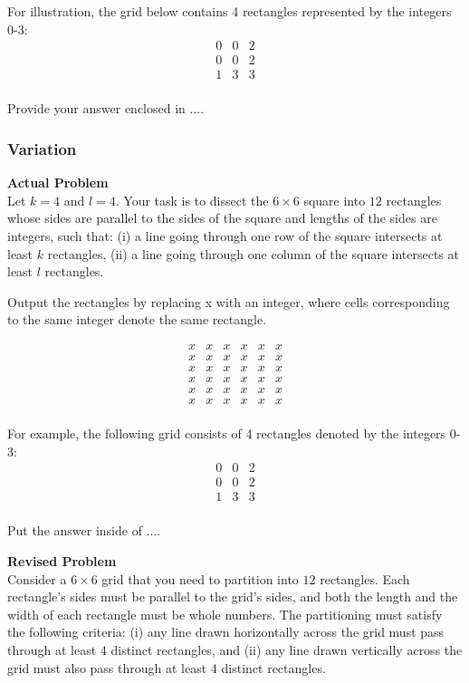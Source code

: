 For illustration, the grid below contains 4 rectangles represented by the integers 0-3:
$$
\begin{array}{ccc}
0 & 0 & 2 \\
0 & 0 & 2 \\
1 & 3 & 3 \\
\end{array}
$$

Provide your answer enclosed in $\boxed{...}$.

\subsubsection{Variation}
\textbf{Actual Problem}\\
Let $k = 4$ and $l = 4$. Your task is to dissect the $6 \times 6$ square into $12$ rectangles whose sides are parallel to the sides of the square
and lengths of the sides are integers, such that: (i) a line going through one row of the square intersects at least $k$ rectangles, (ii) a line going through one column of the square
intersects at least $l$ rectangles.

Output the rectangles by replacing x with an integer, where cells corresponding to the same integer denote the same rectangle.

$$\begin{array}{cccccc}
x & x & x & x & x & x \\
x & x & x & x & x & x \\
x & x & x & x & x & x \\
x & x & x & x & x & x \\
x & x & x & x & x & x \\
x & x & x & x & x & x \\
\end{array}$$

For example, the following grid consists of 4 rectangles denoted by the integers 0-3:
$$
\begin{array}{ccc}
0 & 0 & 2 \\
0 & 0 & 2 \\
1 & 3 & 3 \\
\end{array}
$$

Put the answer inside of $\boxed{...}$.


\textbf{Revised Problem}\\
Consider a $6 \times 6$ grid that you need to partition into $12$ rectangles. Each rectangle's sides must be parallel to the grid's sides, and both the length and the width of each rectangle must be whole numbers. The partitioning must satisfy the following criteria: (i) any line drawn horizontally across the grid must pass through at least $4$ distinct rectangles, and (ii) any line drawn vertically across the grid must also pass through at least $4$ distinct rectangles.

